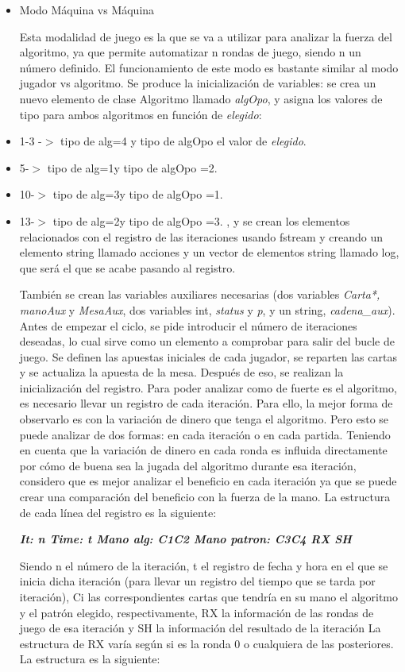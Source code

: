 \begin{itemize}
\item Modo Máquina vs Máquina

Esta modalidad de juego es la que se va a utilizar para analizar la fuerza del algoritmo, ya que permite automatizar n rondas de juego, siendo n un número definido.
El funcionamiento de este modo es bastante similar al modo jugador vs algoritmo. 
Se produce la inicialización de variables: se crea un nuevo elemento de clase Algoritmo llamado \textit{algOpo}, y asigna los valores de tipo para ambos algoritmos en función de  \textit{elegido}:
\item 1-3 -$>$ tipo de alg=4 y tipo de algOpo el valor de \textit{elegido}.
\item 5-$>$ tipo de alg=1y tipo de algOpo =2.
\item 10-$>$ tipo de alg=3y tipo de algOpo =1.
\item 13-$>$ tipo de alg=2y tipo de algOpo =3.
, y se crean los elementos relacionados con el registro de las iteraciones usando fstream y creando un elemento string llamado acciones y un vector de elementos string llamado log, que será el que se acabe pasando al registro. 

También se crean las variables auxiliares necesarias (dos variables \textit{Carta*, manoAux} y \textit{MesaAux}, dos variables int, \textit{status} y \textit{p}, y un string, \textit{cadena\_aux}).
Antes de empezar el ciclo, se pide introducir el número de iteraciones deseadas, lo cual sirve como un elemento a comprobar para salir del bucle de juego.
Se definen las apuestas iniciales de cada jugador, se reparten las cartas y se actualiza la apuesta de la mesa. Después de eso, se realizan la inicialización del registro. 
Para poder analizar como de fuerte es el algoritmo, es necesario llevar un registro de cada iteración. Para ello, la mejor forma de observarlo es con la variación de dinero que tenga el algoritmo. Pero esto se puede analizar de dos formas: en cada iteración o en cada partida. Teniendo en cuenta que la variación de dinero en cada ronda es influida directamente por cómo de buena sea la jugada del algoritmo durante esa iteración, considero que es mejor analizar el beneficio en cada iteración ya que se puede crear una comparación del beneficio con la fuerza de la mano.
La estructura de cada línea del registro es la siguiente:

\textit{\textbf{It: n Time: t \/\/ Mano alg: C1C2 Mano patron: C3C4 \/\/ RX \/\/ SH}}

Siendo n el número de la iteración, t el registro de fecha y hora en el que se inicia dicha iteración (para llevar un registro del tiempo que se tarda por iteración), Ci las correspondientes cartas que tendría en su mano el algoritmo y el patrón elegido, respectivamente, RX la información de las rondas de juego de esa iteración y SH la información del resultado de la iteración
La estructura de RX varía según si es la ronda 0 o cualquiera de las posteriores. La estructura es la siguiente:


\end{itemize}
